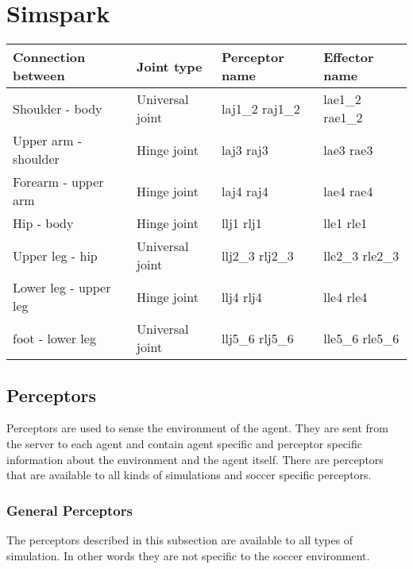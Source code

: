 \chapter{Simspark}

\begin{tabular}{|l|l|l|l|}
\hline
{\bf Connection between}  & {\bf Joint type} & {\bf Perceptor name}& {\bf
Effector name} \\
\hline
Shoulder - body  & Universal joint & laj1\_2  raj1\_2 & lae1\_2   rae1\_2 \\
\hline
Upper arm - shoulder  & Hinge joint & laj3  raj3 & lae3   rae3 \\
\hline
Forearm - upper arm  & Hinge joint & laj4  raj4 & lae4   rae4 \\
\hline
Hip - body  & Hinge joint & llj1  rlj1 & lle1   rle1 \\
\hline
Upper leg - hip & Universal joint & llj2\_3  rlj2\_3 & lle2\_3   rle2\_3 \\
\hline
Lower leg - upper leg & Hinge joint & llj4  rlj4 & lle4   rle4 \\
\hline
foot - lower leg & Universal joint & llj5\_6  rlj5\_6 & lle5\_6   rle5\_6 \\
\hline
\end{tabular}

\section{Perceptors}
Perceptors are used to sense the environment of the agent. They are sent from
the server to each agent and contain agent specific and perceptor specific
information about the environment and the agent itself. There are perceptors
that are available to all kinds of simulations and soccer specific perceptors.

\subsection{General Perceptors}
The perceptors described in this subsection are available to all types of
simulation. In other words they are not specific to the soccer environment.

